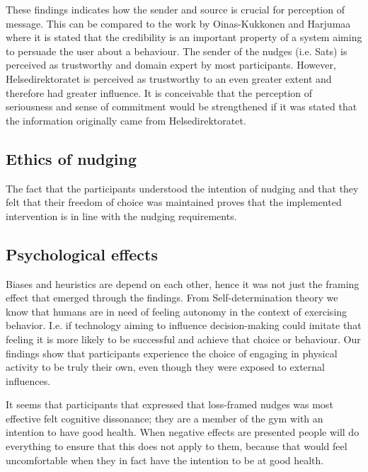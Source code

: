 These findings indicates how the sender and source is crucial for perception of message. This can be compared to the work by Oinas-Kukkonen and Harjumaa\cite{oinas-kukkonen_persuasive_2009}
where it is stated that the credibility is an important property of a system aiming to persuade the user about a behaviour. The sender of the nudges (i.e. Sats) is perceived as trustworthy and domain expert by most participants. However, Helsedirektoratet is perceived as trustworthy to an even greater extent and therefore had greater influence. It is conceivable that the perception of seriousness and sense of commitment would be strengthened if it was stated that the information originally came from Helsedirektoratet. 



\subsection{Ethics of nudging}
The fact that the participants understood the intention of nudging and that they felt that their freedom of choice was maintained proves that the implemented intervention is in line with the nudging requirements.

\subsection{Psychological effects}
Biases and heuristics are depend on each other, hence it was not just the framing effect that emerged through the findings. From Self-determination theory we know that humans are in need of feeling autonomy in the context of exercising behavior. I.e. if technology aiming to influence decision-making could imitate that feeling it is more likely to be successful and achieve that choice or behaviour. Our findings show that participants experience the choice of engaging in physical activity to be truly their own, even though they were exposed to external influences. 

It seems that participants that expressed that loss-framed nudges was most effective felt cognitive dissonance; they are a member of the gym with an intention to have good health. When negative effects are presented people will do everything to ensure that this does not apply to them, because that would feel uncomfortable when they in fact have the intention to be at good health. 

